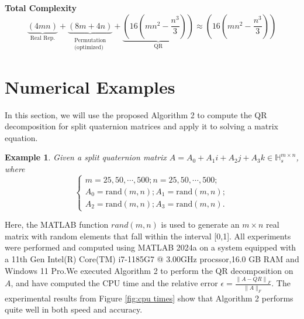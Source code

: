 \documentclass[3p]{elsarticle}
\newtheorem{example}[theorem]{Example}
\numberwithin{equation}{section}
\begin{document}
\textbf{Total Complexity}
$$
\underbrace{(4mn)}_{\text{Real Rep.}} + \underbrace{(8m+4n)}_{\substack{\text{Permutation} \\ \text{(optimized)}}} + \underbrace{(16(mn^2-\frac{n^3}{3}))}_{\text{QR}} \approx \boxed{(16(mn^2-\frac{n^3}{3}))}
$$  


\section{Numerical Examples}
In this section,  we will use the proposed  Algorithm 2 to compute the QR decomposition for split quaternion matrices and apply it to solving a matrix equation.
\begin{example}
    Given a split quaternion matrix $A = A_{0}+A_{1}i+A_{2}j+A_{3}k\in \mathbb{H}_s^{m\times n}$, where
    \begin{equation}
       \begin{cases}
            m = 25,50,\cdots,500;
            n = 25,50,\cdots,500;  \\
            A_{0}=\text{rand}(m,n);
            A_{1}=\text{rand}(m,n); \\
            A_{2}=\text{rand}(m,n);
            A_{3}=\text{rand}(m,n).
        \end{cases} \label{eq:example2}
    \end{equation}
\end{example}
Here, the MATLAB function  $rand(m,n)$ is used to generate an $m \times n$ real matrix with random elements that fall within the interval [0,1]. All experiments were performed and computed using MATLAB 2024a on a system equipped with a 11th Gen Intel(R) Core(TM) i7-1185G7 @ 3.00GHz procssor,16.0 GB RAM and Windows 11 Pro.We executed Algorithm 2 to perform the QR decomposition on $A$, and have computed the CPU time and the relative error
$\epsilon = \frac{\left\|A - Q R\right\|_{F}}{\|A\|_{F}}.$
The experimental results from Figure \ref{fig:cpu times} show that Algorithm 2 performs quite well in both speed and accuracy. 
\end{document}
